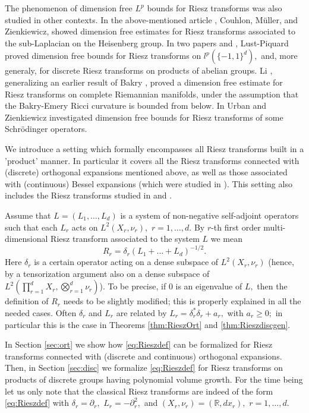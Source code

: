 \documentclass[leqno,12pt]{amsart}
\theoremstyle{definition}
\theoremstyle{remark}
\begin{document}
       The phenomenon of dimension free $L^p$ bounds for Riesz transforms was also studied in other contexts. In the above-mentioned article \cite{CMZ}, Couhlon, M\"uller, and Zienkiewicz, showed dimension free estimates for Riesz transforms associated to the sub-Laplacian on the Heisenberg group. In two papers \cite{Lu_Piqu2} and \cite{Lu_Piqu1}, Lust-Piquard proved dimension free bounds for Riesz transforms on $l^p(\{-1,1\}^d),$ and, more generaly, for discrete Riesz transforms on products of abelian groups. Li \cite{Li1}, generalizing an earlier result of Bakry \cite{Bakr1}, proved a dimension free estimate for Riesz transforms on complete Riemannian manifolds, under the assumption that the Bakry-Emery Ricci curvature is bounded from below. In \cite{UrZien} Urban and Zienkiewicz investigated dimension free bounds for Riesz transforms of some Schr\"odinger operators.

        We introduce a setting which formally encompasses all Riesz transforms built in a 'product' manner. In particular it covers all the Riesz transforms connected with (discrete) orthogonal expansions mentioned above, as well as those associated with (continuous) Bessel expansions (which were studied in \cite{Bet1}). This setting also includes the Riesz transforms studied in \cite{Lu_Piqu1} and \cite{Lu_Piqu2}.

        Assume that $L=(L_1,\ldots,L_d)$ is a system of non-negative self-adjoint operators such that each $L_r$ acts on $L^2(X_r,\nu_r),$ $r=1,\ldots,d.$ By $r$-th first order multi-dimensional Riesz transform associated to the system $L$ we mean \begin{equation}\label{eq:Rieszdef} R_r=\delta_r(L_1+\ldots + L_d)^{-1/2}.\end{equation}
        Here $\delta_r$ is a certain operator acting on a dense subspace of $L^2(X_r,\nu_r)$ (hence, by a tensorization argument also on a dense subspace of $L^2(\prod_{r=1}^d X_r, \bigotimes_{r=1}^d \nu_r)$).
        To be precise, if $0$ is an eigenvalue of $L,$ then the definition of $R_r$ needs to be slightly modified; this is properly explained in all the needed cases. Often $\delta_r$ and $L_r$ are related by $L_r=\delta_r^*\delta_r+a_r,$ with $a_r\geq 0;$ in particular this is the case in Theorems \ref{thm:RieszOrt} and \ref{thm:Rieszdiscgen}.

        In Section \ref{sec:ort} we show how \eqref{eq:Rieszdef} can be formalized for Riesz transforms connected with (discrete and continuous) orthogonal expansions. Then, in Section \ref{sec:disc} we formalize \eqref{eq:Rieszdef} for Riesz transforms on products of discrete groups having polynomial volume growth. For the time being let us only note that the classical Riesz transforms are indeed of the form \eqref{eq:Rieszdef} with $\delta_r=\partial_r,$ $L_r=-\partial_r^2,$ and $(X_r,\nu_r)=(\mathbb{R},dx_r),$  $r=1,\ldots,d.$
\end{document}
